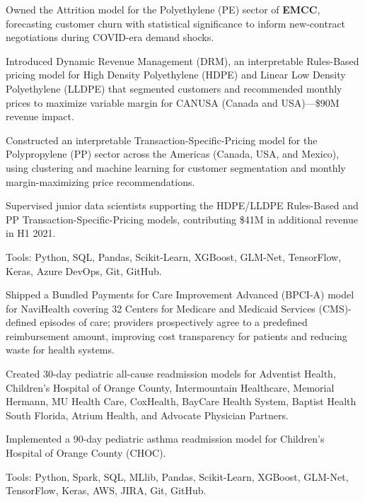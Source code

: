 \documentclass[]{template}
\begin{document}
\vspace{\topsep}

\begin{tightemize}
\item Owned the Attrition model for the Polyethylene (PE) sector of \textbf{EMCC}, forecasting customer churn with statistical significance to inform new-contract negotiations during COVID-era demand shocks.

\item Introduced Dynamic Revenue Management (DRM), an interpretable Rules-Based pricing model for High Density Polyethylene (HDPE) and Linear Low Density Polyethylene (LLDPE) that segmented customers and recommended monthly prices to maximize variable margin for CANUSA (Canada and USA)---\$90M revenue impact.

\item Constructed an interpretable Transaction-Specific-Pricing model for the Polypropylene (PP) sector across the Americas (Canada, USA, and Mexico), using clustering and machine learning for customer segmentation and monthly margin-maximizing price recommendations.

\item Supervised junior data scientists supporting the HDPE/LLDPE Rules-Based and PP Transaction-Specific-Pricing models, contributing \$41M in additional revenue in H1 2021.

\item Tools: Python, SQL, Pandas, Scikit-Learn, XGBoost, GLM-Net, TensorFlow, Keras, Azure DevOps, Git, GitHub.
\end{tightemize}
\sectionsep


\sectionsep
{}

\vspace{\topsep} %
\begin{tightemize}
\item Shipped a Bundled Payments for Care Improvement Advanced (BPCI-A) model for NaviHealth covering 32 Centers for Medicare and Medicaid Services (CMS)-defined episodes of care; providers prospectively agree to a predefined reimbursement amount, improving cost transparency for patients and reducing waste for health systems.

\item Created 30-day pediatric all-cause readmission models for Adventist Health, Children's Hospital of Orange County, Intermountain Healthcare, Memorial Hermann, MU Health Care, CoxHealth, BayCare Health System, Baptist Health South Florida, Atrium Health, and Advocate Physician Partners.

\item Implemented a 90-day pediatric asthma readmission model for Children's Hospital of Orange County (CHOC).

\item Tools: Python, Spark, SQL, MLlib, Pandas, Scikit-Learn, XGBoost, GLM-Net, TensorFlow, Keras, AWS, JIRA, Git, GitHub.
\end{tightemize}
\sectionsep
\sectionsep
\end{document}
